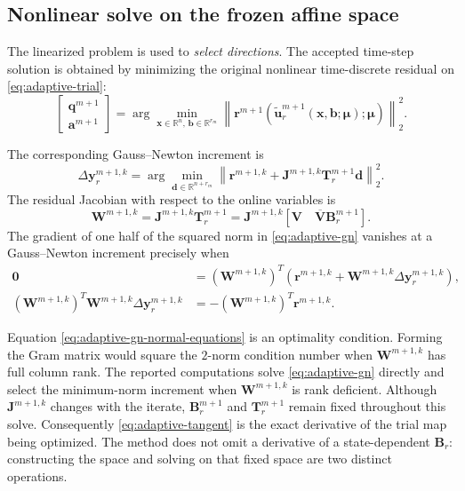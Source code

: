 \documentclass[11pt]{article}
\newcommand{\q}{\mathbf q}
\newcommand{\utilde}{\widetilde{\mathbf u}}
\newcommand{\mub}{\bm\mu}
\newcommand{\norm}[1]{\left\lVert #1 \right\rVert}
\begin{document}
\subsection{Nonlinear solve on the frozen affine space}
The linearized problem is used to \emph{select directions}.  The accepted
time-step solution is obtained by minimizing the original nonlinear
time-discrete residual on \eqref{eq:adaptive-trial}:
\begin{equation}
\begin{bmatrix}\q^{m+1}\\\mathbf a^{m+1}\end{bmatrix}
=\arg\min_{\mathbf x\in\mathbb R^n,\,\mathbf b\in\mathbb R^{r_m}}
\norm{\mathbf r^{m+1}
(\utilde_r^{m+1}(\mathbf x,\mathbf b;\mub);\mub)}_2^2.
\label{eq:adaptive-nonlinear-lspg}
\end{equation}
\begin{samepage}
The corresponding Gauss--Newton increment is
\begin{equation}
\Delta\mathbf y_r^{m+1,k}
=\arg\min_{\mathbf d\in\mathbb R^{n+r_m}}
\norm{\mathbf r^{m+1,k}+
\mathbf J^{m+1,k}\mathbf T_r^{m+1}\mathbf d}_2^2.
\label{eq:adaptive-gn}
\end{equation}
The residual Jacobian with respect to the online variables is
\begin{equation*}
\mathbf W^{m+1,k}
=\mathbf J^{m+1,k}\mathbf T_r^{m+1}
=\mathbf J^{m+1,k}
\left[\mathbf V\quad\overline{\mathbf V}\mathbf B_r^{m+1}\right].
\end{equation*}
The gradient of one half of the squared norm in
\eqref{eq:adaptive-gn} vanishes at a Gauss--Newton increment precisely
when
\begin{equation}
\begin{aligned}
\mathbf0&=(\mathbf W^{m+1,k})^T
\left(\mathbf r^{m+1,k}
+\mathbf W^{m+1,k}\Delta\mathbf y_r^{m+1,k}\right),\\
(\mathbf W^{m+1,k})^T\mathbf W^{m+1,k}
\Delta\mathbf y_r^{m+1,k}
&=-(\mathbf W^{m+1,k})^T\mathbf r^{m+1,k}.
\end{aligned}
\label{eq:adaptive-gn-normal-equations}
\end{equation}
\end{samepage}
Equation \eqref{eq:adaptive-gn-normal-equations} is an optimality
condition.  Forming the Gram matrix would square the
$2$-norm condition number when $\mathbf W^{m+1,k}$ has full column
rank.  The reported computations solve \eqref{eq:adaptive-gn}
directly and select the minimum-norm increment when
$\mathbf W^{m+1,k}$ is rank deficient.
Although $\mathbf J^{m+1,k}$ changes with the iterate,
$\mathbf B_r^{m+1}$ and $\mathbf T_r^{m+1}$ remain fixed throughout
this solve.  Consequently \eqref{eq:adaptive-tangent} is the exact
derivative of the trial map being optimized.  The method does not omit a
derivative of a state-dependent $\mathbf B_r$: constructing the space and
solving on that fixed space are two distinct operations.
\end{document}
